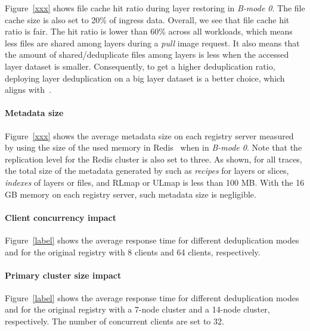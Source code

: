 Figure~\ref{xxx} shows file cache hit ratio during layer restoring in \emph{B-mode 0}.
The file cache size is also set to 20\% of ingress data.
Overall, we see that file cache hit ratio is fair.
The hit ratio is lower than 60\% across all workloads, which means less files are shared among layers during a \emph{pull} image request.
It also means that the amount of shared/deduplicate files among layers is less when the accessed layer dataset is smaller.
Consequently, to get a higher deduplication ratio, deploying layer deduplication on a big layer dataset is a better choice, which aligns with~\cite{dedupanalysis}.


\paragraph{Metadata size} 
Figure~\ref{xxx} shows the average metadata size on each registry server measured by using the size of the used memory in Redis~\cite{redis} when in \emph{B-mode 0}.
Note that the replication level for the Redis cluster is also set to three.
As shown, for all traces, the total size of the metadata generated by \sysname such as \emph{recipes} for layers or slices, \emph{indexes} of layers or files, and RLmap or ULmap is less than 100 MB.
With the 16 GB memory on each registry server, such metadata size is negligible.

\paragraph{Client concurrency impact}
Figure~\ref{label} shows the average response time for different deduplication modes and for the original registry with 8 clients and 64 clients, respectively.

\paragraph{Primary cluster size  impact}
Figure~\ref{label} shows the average response time for different deduplication modes and for the original registry with a 7-node cluster and a 14-node cluster, respectively.
The number of concurrent clients are set to 32.




